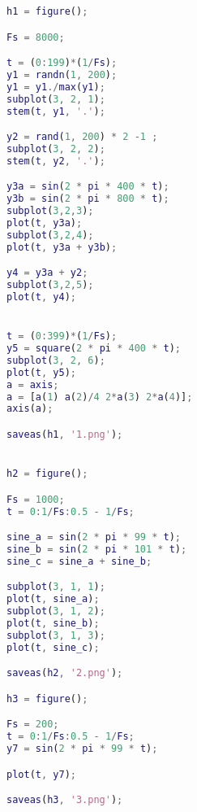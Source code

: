 \documentclass[11pt, a4paper]{article}
\begin{document}
\begin{lstlisting}[language=matlab, frame=single]
h1 = figure();

Fs = 8000;

t = (0:199)*(1/Fs);
y1 = randn(1, 200);
y1 = y1./max(y1);
subplot(3, 2, 1);
stem(t, y1, '.');

y2 = rand(1, 200) * 2 -1 ;
subplot(3, 2, 2);
stem(t, y2, '.');

y3a = sin(2 * pi * 400 * t);
y3b = sin(2 * pi * 800 * t);
subplot(3,2,3);
plot(t, y3a);
subplot(3,2,4);
plot(t, y3a + y3b);

y4 = y3a + y2;
subplot(3,2,5);
plot(t, y4);


t = (0:399)*(1/Fs);
y5 = square(2 * pi * 400 * t);
subplot(3, 2, 6);
plot(t, y5);
a = axis;
a = [a(1) a(2)/4 2*a(3) 2*a(4)];
axis(a);

saveas(h1, '1.png');


h2 = figure();

Fs = 1000;
t = 0:1/Fs:0.5 - 1/Fs;

sine_a = sin(2 * pi * 99 * t); 
sine_b = sin(2 * pi * 101 * t); 
sine_c = sine_a + sine_b;

subplot(3, 1, 1);
plot(t, sine_a);
subplot(3, 1, 2);
plot(t, sine_b);
subplot(3, 1, 3);
plot(t, sine_c);

saveas(h2, '2.png');

h3 = figure();

Fs = 200;
t = 0:1/Fs:0.5 - 1/Fs;
y7 = sin(2 * pi * 99 * t); 

plot(t, y7);

saveas(h3, '3.png');
\end{lstlisting}
    
        
        
        
\end{document}
